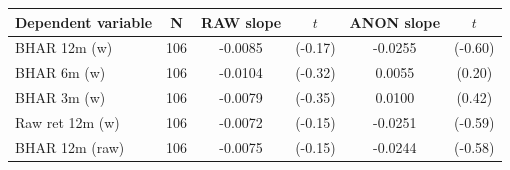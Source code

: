 \begin{tabular}{lccccc}
\toprule
Dependent variable & N & RAW slope & $t$ & ANON slope & $t$ \\
\midrule
BHAR 12m (w) & 106 & -0.0085 & (-0.17) & -0.0255 & (-0.60) \\
BHAR 6m (w) & 106 & -0.0104 & (-0.32) & 0.0055 & (0.20) \\
BHAR 3m (w) & 106 & -0.0079 & (-0.35) & 0.0100 & (0.42) \\
Raw ret 12m (w) & 106 & -0.0072 & (-0.15) & -0.0251 & (-0.59) \\
BHAR 12m (raw) & 106 & -0.0075 & (-0.15) & -0.0244 & (-0.58) \\
\bottomrule
\end{tabular}